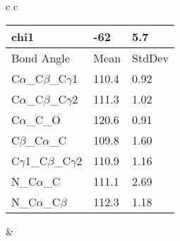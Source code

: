 \begin{longtable}{ c c }
\begin{tabular}{ l l l }
  chi1 & -62 & 5.7 \\ \midrule
  Bond Angle   & Mean     & StdDev \\ \midrule
  C$\alpha$\_C$\beta$\_C$\gamma$1 & 110.4 & 0.92\\
  C$\alpha$\_C$\beta$\_C$\gamma$2 & 111.3 & 1.02\\
  C$\alpha$\_C\_O & 120.6 & 0.91\\
  C$\beta$\_C$\alpha$\_C & 109.8 & 1.60\\
  C$\gamma$1\_C$\beta$\_C$\gamma$2 & 110.9 & 1.16\\
  N\_C$\alpha$\_C & 111.1 & 2.69\\
  N\_C$\alpha$\_C$\beta$ & 112.3 & 1.18\\
  \bottomrule
  \end{tabular}
  &
  \\
  
\end{longtable}

\newpage

